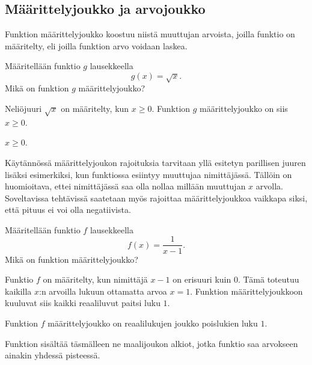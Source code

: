 \subsection*{Määrittelyjoukko ja arvojoukko}

Funktion määrittelyjoukko koostuu niistä muuttujan arvoista, joilla
funktio on määritelty, eli joilla funktion arvo voidaan laskea.

\begin{esimerkki}
	 Määritellään funktio $g$ lausekkeella \[ g(x) = \sqrt{x}. \]
	 Mikä on funktion $g$ määrittelyjoukko?
	 \begin{esimratk}
		Neliöjuuri $\sqrt{x}$ on määritelty, kun $x\geq{0}$. Funktion $g$ määrittelyjoukko on siis $x\geq{0}$.
	 \end{esimratk}
	 \begin{esimvast}
	  $x\geq{0}$.
	 \end{esimvast}
\end{esimerkki}

Käytännössä määrittelyjoukon rajoituksia tarvitaan yllä esitetyn parillisen juuren lisäksi esimerkiksi, kun funktiossa esiintyy muuttujaa nimittäjässä.
Tällöin on huomioitava, ettei nimittäjässä saa olla nollaa millään muuttujan $x$ arvolla. 
Soveltavissa tehtävissä saatetaan myös rajoittaa määrittelyjoukkoa vaikkapa siksi, että pituus ei voi olla negatiivista.

\begin{esimerkki}
	Määritellään funktio $f$ lausekkeella \[ f(x) = \frac{1}{x-1}. \]
	Mikä on funktion määrittelyjoukko?
	\begin{esimratk}
		Funktio $f$ on määritelty, kun nimittäjä $x-1$ on erisuuri kuin 0.
		Tämä toteutuu kaikilla $x$:n arvoilla lukuun ottamatta arvoa $x = 1$.
		Funktion määrittelyjoukkoon kuuluvat siis kaikki reaaliluvut paitsi luku $1$.
	\end{esimratk}
	\begin{esimvast}
		Funktion $f$ määrittelyjoukko on reaalilukujen joukko poislukien luku $1$.
	\end{esimvast}
\end{esimerkki}


Funktion  sisältää täsmälleen ne maalijoukon alkiot,
jotka funktio saa arvokseen ainakin yhdessä pisteessä.

